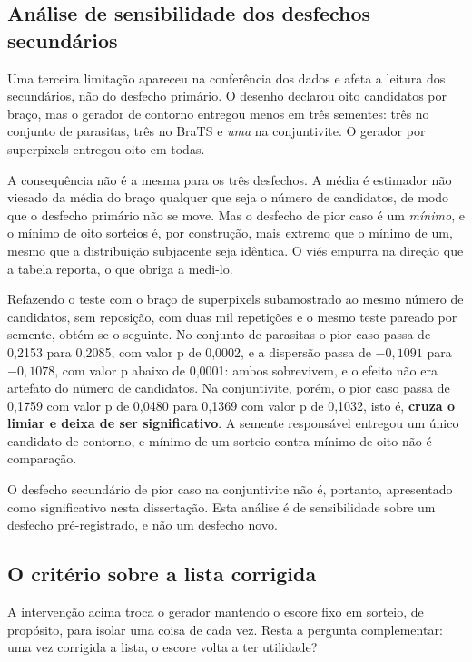 \subsection{Análise de sensibilidade dos desfechos secundários}
\label{sec_sensibilidade}

Uma terceira limitação apareceu na conferência dos dados e afeta a leitura dos secundários, não do desfecho primário. O desenho declarou oito candidatos por braço, mas o gerador de contorno entregou menos em três sementes: três no conjunto de parasitas, três no BraTS e \emph{uma} na conjuntivite. O gerador por superpixels entregou oito em todas.

A consequência não é a mesma para os três desfechos. A média é estimador não viesado da média do braço qualquer que seja o número de candidatos, de modo que o desfecho primário não se move. Mas o desfecho de pior caso é um \emph{mínimo}, e o mínimo de oito sorteios é, por construção, mais extremo que o mínimo de um, mesmo que a distribuição subjacente seja idêntica. O viés empurra na direção que a tabela reporta, o que obriga a medi-lo.

Refazendo o teste com o braço de superpixels subamostrado ao mesmo número de candidatos, sem reposição, com duas mil repetições e o mesmo teste pareado por semente, obtém-se o seguinte. No conjunto de parasitas o pior caso passa de 0,2153 para 0,2085, com valor p de 0,0002, e a dispersão passa de $-0{,}1091$ para $-0{,}1078$, com valor p abaixo de 0,0001: ambos sobrevivem, e o efeito não era artefato do número de candidatos. Na conjuntivite, porém, o pior caso passa de 0,1759 com valor p de 0,0480 para 0,1369 com valor p de 0,1032, isto é, \textbf{cruza o limiar e deixa de ser significativo}. A semente responsável entregou um único candidato de contorno, e mínimo de um sorteio contra mínimo de oito não é comparação.

O desfecho secundário de pior caso na conjuntivite não é, portanto, apresentado como significativo nesta dissertação. Esta análise é de sensibilidade sobre um desfecho pré-registrado, e não um desfecho novo.

\subsection{O critério sobre a lista corrigida}

A intervenção acima troca o gerador mantendo o escore fixo em sorteio, de propósito, para isolar uma coisa de cada vez. Resta a pergunta complementar: uma vez corrigida a lista, o escore volta a ter utilidade?

